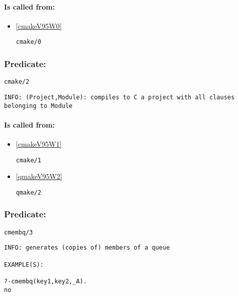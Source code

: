 \paragraph{Is called from:} 
\begin{itemize}
\item \ref{cmakeV95W0} 
\begin{verbatim}
cmake/0
\end{verbatim}

\end{itemize}

\subsubsection{Predicate:} \label{cmakeV95W2}

\begin{verbatim}
cmake/2
\end{verbatim}

{\small \begin{verbatim}
INFO: (Project,Module): compiles to C a project with all clauses belonging to Module

\end{verbatim}}
\paragraph{Is called from:} 
\begin{itemize}
\item \ref{cmakeV95W1} 
\begin{verbatim}
cmake/1
\end{verbatim}

\item \ref{qmakeV95W2} 
\begin{verbatim}
qmake/2
\end{verbatim}

\end{itemize}

\subsubsection{Predicate:} \label{cmembqV95W3}

\begin{verbatim}
cmembq/3
\end{verbatim}

{\small \begin{verbatim}
INFO: generates (copies of) members of a queue

EXAMPLE(S):

?-cmembq(key1,key2,_A).
no

\end{verbatim}}
